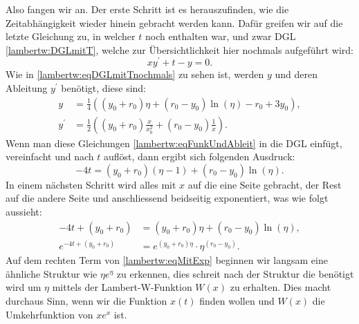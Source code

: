 Also fangen wir an. Der erste Schritt ist es herauszufinden, wie die Zeitabhängigkeit wieder hinein gebracht werden kann. Dafür greifen wir auf die letzte Gleichung zu, in welcher \(t\) noch enthalten war, und zwar DGL \eqref{lambertw:DGLmitT}, welche zur Übersichtlichkeit hier nochmals aufgeführt wird:
\begin{equation}
	x y^{\prime} + t - y
	= 0.
	\label{lambertw:eqDGLmitTnochmals}
\end{equation}
Wie in \eqref{lambertw:eqDGLmitTnochmals} zu sehen ist, werden \(y\) und deren Ableitung \(y^{\prime}\) benötigt, diese sind:
\begin{subequations}
	\begin{align}
		y
		&=
		\frac{1}{4}\left(\left(y_0+r_0\right)\eta+\left(r_0-y_0\right)\operatorname{ln}\left(\eta\right)-r_0+3y_0\right), \\
		\label{lambertw:eqFunkUndAbleit1}
		y^\prime
		&=
		\frac{1}{2}\left(\left(y_0+r_0\right)\frac{x}{x_0^2}+\left(r_0-y_0\right)\frac{1}{x}\right).
	\end{align}
	\label{lambertw:eqFunkUndAbleit}
\end{subequations}
Wenn man diese Gleichungen \ref{lambertw:eqFunkUndAbleit} in die DGL \label{lambertw:eqDGLmitTnochmals} einfügt, vereinfacht und nach \(t\) auflöst, dann ergibt sich folgenden Ausdruck:
\begin{equation}
	-4t
	=
	\left(y_0+r_0\right)\left(\eta-1\right)+\left(r_0-y_0\right)\operatorname{ln}\left(\eta\right).
	\label{lambertw:eqFunkUndAbleitEingefuegt}
\end{equation}
In einem nächsten Schritt wird alles mit \(x\) auf die eine Seite gebracht, der Rest auf die andere Seite und anschliessend beidseitig exponentiert, was wie folgt aussieht:
\begin{align}
	-4t+\left(y_0+r_0\right)
	&=
	\left(y_0+r_0\right)\eta+\left(r_0-y_0\right)\operatorname{ln}\left(\eta\right), \\
	e^{\displaystyle -4t+\left(y_0+r_0\right)}
	&=
	e^{\displaystyle \left(y_0+r_0\right)\eta}\cdot\eta^{\displaystyle \left(r_0-y_0\right)}.
	\label{lambertw:eqMitExp}
\end{align}
Auf dem rechten Term von \eqref{lambertw:eqMitExp} beginnen wir langsam eine ähnliche Struktur wie \(\eta e^\eta\) zu erkennen, dies schreit nach der Struktur die benötigt wird um \(\eta\) mittels der Lambert-W-Funktion \(W(x)\) zu erhalten. Dies macht durchaus Sinn, wenn wir die Funktion \(x(t)\) finden wollen und \(W(x)\) die Umkehrfunktion von \(x e^x\) ist. 

